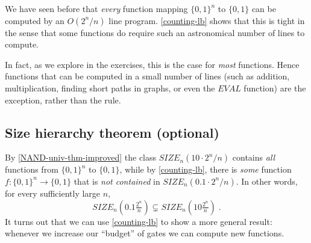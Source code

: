 We have seen before that \emph{every} function mapping \(\{0,1\}^n\) to
\(\{0,1\}\) can be computed by an \(O(2^n /n)\) line program.
\cref{counting-lb} shows that this is tight in the sense that some
functions do require such an astronomical number of lines to compute.

\hypertarget{countinglb}{}

In fact, as we explore in the exercises, this is the case for
\emph{most} functions. Hence functions that can be computed in a small
number of lines (such as addition, multiplication, finding short paths
in graphs, or even the \(\ensuremath{\mathit{EVAL}}\) function) are the
exception, rather than the rule.

\hypertarget{efficientrepresentation}{}

\subsection{Size hierarchy theorem
(optional)}\label{Size-hierarchy-theorem-op}

By \cref{NAND-univ-thm-improved} the class
\(\ensuremath{\mathit{SIZE}}_{n}(10 \cdot 2^n /n)\) contains \emph{all}
functions from \(\{0,1\}^n\) to \(\{0,1\}\), while by
\cref{counting-lb}, there is \emph{some} function
\(f:\{0,1\}^n \rightarrow \{0,1\}\) that is \emph{not contained} in
\(\ensuremath{\mathit{SIZE}}_{n}(0.1 \cdot 2^n / n)\). In other words,
for every sufficiently large \(n\), \[
\ensuremath{\mathit{SIZE}}_n\left(0.1 \tfrac{2^n}{n} \right) \subsetneq \ensuremath{\mathit{SIZE}}_n\left(10 \tfrac{2^n}{n} \right) \;.
\] It turns out that we can use \cref{counting-lb} to show a more
general result: whenever we increase our ``budget'' of gates we can
compute new functions.

